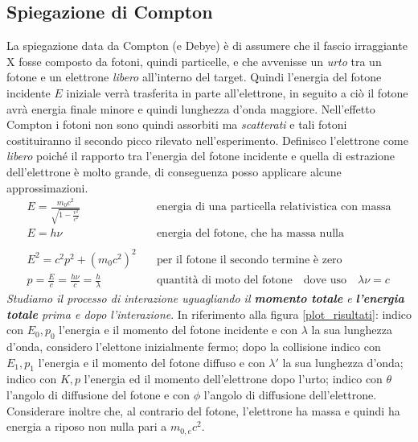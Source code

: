 \subsection{Spiegazione di Compton}
La spiegazione data da Compton (e Debye) è di assumere che il fascio irraggiante X fosse composto da fotoni, quindi particelle, e che avvenisse un \textit{urto} tra un fotone e un elettrone \textit{libero} all'interno del target.
Quindi l'energia del fotone incidente $E$ iniziale verrà trasferita in parte all'elettrone, in seguito a ciò il fotone avrà energia finale minore e quindi lunghezza d'onda maggiore.
Nell'effetto Compton i fotoni non sono quindi assorbiti ma \textit{scatterati} e tali fotoni costituiranno il secondo picco rilevato nell'esperimento.
Definisco l'elettrone come \textit{libero} poiché il rapporto tra l'energia del fotone incidente e quella di estrazione dell'elettrone è molto grande, di conseguenza posso applicare alcune approssimazioni.
\begin{equation}
\begin{split}
E = \frac{ m_0 c^2}{\sqrt{1 - \frac{ v^2}{c^2 }} } & \quad \mbox{energia di una particella relativistica con massa} \\
E = h \nu & \quad \mbox{energia del fotone, che ha massa nulla} \\ \\
E^2 = c^2 p^2 + (m_0 c^2)^2 & \quad \mbox{per il fotone il secondo termine è zero} \\
p = \frac{ E}{c } = \frac{ h \nu}{c } = \frac{ h}{ \lambda} & \quad \mbox{quantità di moto del fotone} \quad \mbox{dove uso} \quad \lambda \nu = c
\end{split}
\end{equation}
\textit{Studiamo il processo di interazione uguagliando il \textbf{momento totale} e \textbf{l'energia totale} prima e dopo l'interazione}.
In riferimento alla figura \ref{plot_risultati}:
indico con $E_0, p_0$ l'energia e il momento del fotone incidente e con $\lambda$ la sua lunghezza d'onda, considero l'elettone inizialmente fermo;
dopo la collisione indico con $E_1, p_1$ l'energia e il momento del fotone diffuso e con $\lambda'$ la sua lunghezza d'onda; 
indico con $K, p$ l'energia ed il momento dell'elettrone dopo l'urto;
indico con $\theta$ l'angolo di diffusione del fotone e con $\phi$ l'angolo di diffusione dell'elettrone.
Considerare inoltre che, al contrario del fotone, l'elettrone ha massa e quindi ha energia a riposo non nulla pari a $m_{0,e}c^2$.

